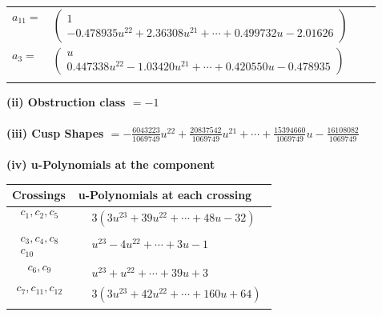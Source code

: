 \documentclass[1p]{elsarticle_modified}
\theoremstyle{definition}
\begin{document}
\begin{tabular}{m{7pt} m{180pt} m{7pt} m{180pt} }
\flushright $a_{11}=$&$\begin{pmatrix}1\\-0.478935 u^{22}+2.36308 u^{21}+\cdots+0.499732 u-2.01626\end{pmatrix}$ \\
\flushright $a_{3}=$&$\begin{pmatrix}u\\0.447338 u^{22}-1.03420 u^{21}+\cdots+0.420550 u-0.478935\end{pmatrix}$\\&\end{tabular}
\flushleft \textbf{(ii) Obstruction class $= -1$}\\~\\
\flushleft \textbf{(iii) Cusp Shapes $= -\frac{6043223}{1069749} u^{22}+\frac{20837542}{1069749} u^{21}+\cdots+\frac{15394660}{1069749} u-\frac{16108082}{1069749}$}\\~\\
\newpage\renewcommand{\arraystretch}{1}
\flushleft \textbf{(iv) u-Polynomials at the component}\newline \\
\begin{tabular}{m{50pt}|m{274pt}}
Crossings & \hspace{64pt}u-Polynomials at each crossing \\
\hline $$\begin{aligned}c_{1},c_{2},c_{5}\end{aligned}$$&$\begin{aligned}
&3(3 u^{23}+39 u^{22}+\cdots+48 u-32)
\end{aligned}$\\
\hline $$\begin{aligned}c_{3},c_{4},c_{8}\\c_{10}\end{aligned}$$&$\begin{aligned}
&u^{23}-4 u^{22}+\cdots+3 u-1
\end{aligned}$\\
\hline $$\begin{aligned}c_{6},c_{9}\end{aligned}$$&$\begin{aligned}
&u^{23}+u^{22}+\cdots+39 u+3
\end{aligned}$\\
\hline $$\begin{aligned}c_{7},c_{11},c_{12}\end{aligned}$$&$\begin{aligned}
&3(3 u^{23}+42 u^{22}+\cdots+160 u+64)
\end{aligned}$\\
\hline
\end{tabular}\\~\\
\end{document}
